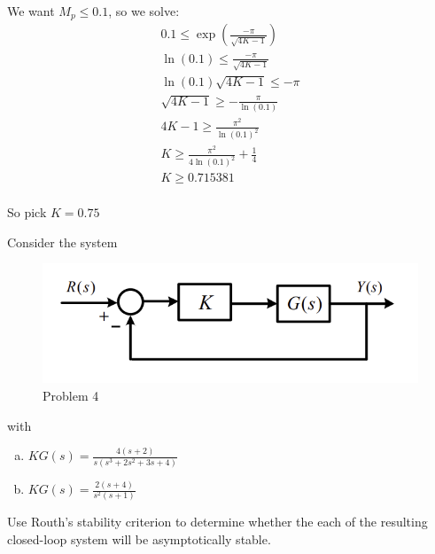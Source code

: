 \documentclass[11pt]{article}
\begin{document}
We want $M_p \leq 0.1$, so we solve:
\begin{align*}
    0.1 \leq \exp\left(\frac{-\pi}{\sqrt{4K - 1}}\right) \\
    \ln(0.1) \leq \frac{-\pi}{\sqrt{4K - 1}} \\
    \ln(0.1) \sqrt{4K - 1} \leq -\pi \\
    \sqrt{4K - 1} \geq -\frac{\pi}{\ln(0.1)} \\
    4K - 1 \geq \frac{\pi^2}{\ln(0.1)^2} \\
    K \geq \frac{\pi^2}{4 \ln(0.1)^2} + \frac{1}{4} \\
    K \geq 0.715381 \\
\end{align*}

So pick $K = 0.75$


Consider the system
\begin{figure}[h] 
    \centering
    \includegraphics[width=0.55 \linewidth]{prob4}
    \caption{Problem 4}
    \label{fig:p4}
\end{figure}

with \begin{enumerate}[a)]
    \item $KG(s) = \frac{4(s+2)}{s(s^3+2s^2+3s+4)}$
    \item $KG(s) = \frac{2(s+4)}{s^2(s+1)}$
\end{enumerate}

Use Routh's stability criterion to determine whether the each of the resulting closed-loop
system will be asymptotically stable.

\soln
\end{document}
